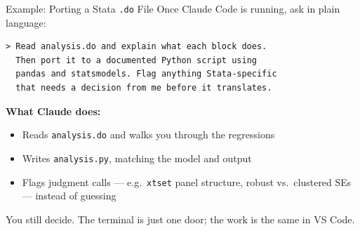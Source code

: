 \documentclass[aspectratio=169, 11pt]{beamer}
\begin{document}
\begin{frame}[fragile]{Example: Porting a Stata \texttt{.do} File}
  Once Claude Code is running, ask in plain language:

  \vspace{0.3em}
\begin{lstlisting}[basicstyle=\ttfamily\footnotesize]
> Read analysis.do and explain what each block does.
  Then port it to a documented Python script using
  pandas and statsmodels. Flag anything Stata-specific
  that needs a decision from me before it translates.
\end{lstlisting}

  \vspace{0.4em}
  \textbf{What Claude does:}
  \begin{itemize}
    \item Reads \texttt{analysis.do} and walks you through the regressions
    \item Writes \texttt{analysis.py}, matching the model and output
    \item Flags judgment calls --- e.g.\ \texttt{xtset} panel structure, robust vs.\ clustered SEs --- instead of guessing
  \end{itemize}

  \vspace{0.3em}
  \alert{You still decide. The terminal is just one door; the work is the same in VS Code.}
\end{frame}

\end{document}
